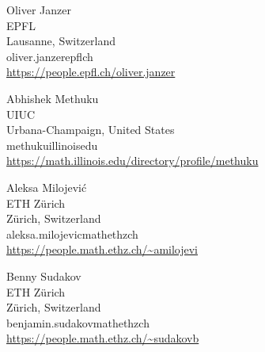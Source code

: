 \documentclass{daj}
\theoremstyle{plain}
\theoremstyle{remark}
\begin{document}
\begin{dajauthors}
\begin{authorinfo}[oliver]
  Oliver Janzer\\
  EPFL\\
  Lausanne, Switzerland\\
  oliver.janzer\imageat{}epfl\imagedot{}ch \\
  \url{https://people.epfl.ch/oliver.janzer}
\end{authorinfo}
\begin{authorinfo}[abhishek]
  Abhishek Methuku\\
  UIUC\\
  Urbana-Champaign, United States\\
  methuku\imageat{}illinois\imagedot{}edu \\
  \url{https://math.illinois.edu/directory/profile/methuku}
\end{authorinfo}
\begin{authorinfo}[aleksa]
  Aleksa Milojevi\'c\\
  ETH Z\"urich\\
  Z\"urich, Switzerland\\
  aleksa.milojevic\imageat{}math\imagedot{}ethz\imagedot{}ch\\
  \url{https://people.math.ethz.ch/~amilojevi}
\end{authorinfo}
\begin{authorinfo}[benny]
  Benny Sudakov\\
  ETH Z\"urich\\
  Z\"urich, Switzerland\\
  benjamin.sudakov\imageat{}math\imagedot{}ethz\imagedot{}ch\\
  \url{https://people.math.ethz.ch/~sudakovb}
\end{authorinfo}
\end{dajauthors}
\end{document}
